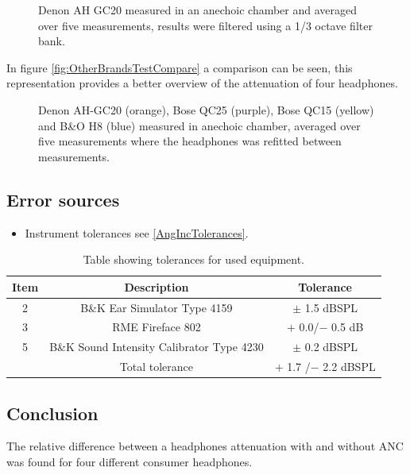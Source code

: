 \begin{figure}[H]
	\centering
	
	\caption{Denon AH GC20 measured in an anechoic chamber and averaged over five measurements, results were filtered using a 1/3 octave filter bank.}
	\label{fig:DenonComp}
\end{figure}

In figure \autoref{fig:OtherBrandsTestCompare} a comparison can be seen, this representation provides a better overview of the attenuation of four headphones.


\begin{figure}[H]
	\centering
	
	\caption{Denon AH-GC20 (orange), Bose QC25 (purple), Bose QC15 (yellow) and B\&O H8 (blue) measured in anechoic chamber, averaged over five measurements where the headphones was refitted between measurements.}
	\label{fig:OtherBrandsTestCompare}
\end{figure}

\subsection{Error sources}

\begin{itemize}
	\item Instrument tolerances see \autoref{AngIncTolerances}.
\end{itemize}

\begin{table}[H]
	\centering
	\begin{tabular}{ c c c } \toprule
		{Item}	& 		{Description} 	& {Tolerance}	 \\ \bottomrule 
		2	&	B\&K Ear Simulator Type 4159				& $\pm$ 1.5 dBSPL \cite{BK4159Tol} 	\\
		3	& RME Fireface 802								& $+$ 0.0/$-$ 0.5 dB\cite{RME802} \\
		5	&	B\&K Sound Intensity Calibrator Type 4230	& $\pm$ 0.2 dBSPL\cite{BK4231Tol}	\\
		\bottomrule
		&	Total tolerance								& $+$ 1.7 /$-$ 2.2 dBSPL	\\ \bottomrule	
	\end{tabular}
	\caption{Table showing tolerances for used equipment.}
	\label{AngIncTolerances}
\end{table}


\subsection{Conclusion}
The relative difference between a headphones attenuation with and without ANC was found for four different consumer headphones.




